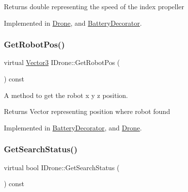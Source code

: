 \begin{DoxyReturn}{Returns}
double representing the speed of the index propeller 
\end{DoxyReturn}


Implemented in \hyperlink{classDrone_a7b2fd7d3ed57cec48ebdcd09f97b83f7}{Drone}, and \hyperlink{classBatteryDecorator_a361154605b803347aea2422cae7d0183}{Battery\+Decorator}.

\mbox{\label{classIDrone_a1c3f5e712a97625c74c35952b930d68d}} 
\subsubsection{\texorpdfstring{Get\+Robot\+Pos()}{GetRobotPos()}}
{\footnotesize\ttfamily virtual \hyperlink{classVector3}{Vector3} I\+Drone\+::\+Get\+Robot\+Pos (\begin{DoxyParamCaption}{ }\end{DoxyParamCaption}) const\hspace{0.3cm}{\ttfamily [pure virtual]}}



A method to get the robot x y z position. 

\begin{DoxyReturn}{Returns}
Vector representing position where robot found 
\end{DoxyReturn}


Implemented in \hyperlink{classBatteryDecorator_ac9f7223d439db341e9765ea3d5584f4e}{Battery\+Decorator}, and \hyperlink{classDrone_afdba5de8493255a433d62382991dfe8e}{Drone}.

\mbox{\label{classIDrone_aed9abde2152408ef3483da57f24c4006}} 
\subsubsection{\texorpdfstring{Get\+Search\+Status()}{GetSearchStatus()}}
{\footnotesize\ttfamily virtual bool I\+Drone\+::\+Get\+Search\+Status (\begin{DoxyParamCaption}{ }\end{DoxyParamCaption}) const\hspace{0.3cm}{\ttfamily [pure virtual]}}



